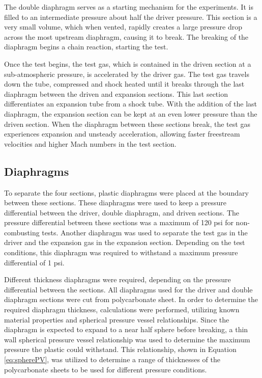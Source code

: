 The double diaphragm serves as a starting mechanism for the experiments. It is filled to an intermediate pressure about half the driver pressure. This section is a very small volume, which when vented, rapidly creates a large pressure drop across the most upstream diaphragm, causing it to break. The breaking of the diaphragm begins a chain reaction, starting the test. 

Once the test begins, the test gas, which is contained in the driven section at a sub-atmospheric pressure, is accelerated by the driver gas. The test gas travels down the tube, compressed and shock heated until it breaks through the last diaphragm between the driven and expansion sections. This last section differentiates an expansion tube from a shock tube. With the addition of the last diaphragm, the expansion section can be kept at an even lower pressure than the driven section. When the diaphragm between these sections break, the test gas experiences  expansion and unsteady acceleration, allowing faster freestream velocities and higher Mach numbers in the test section. 


\subsection{Diaphragms}
To separate the four sections, plastic diaphragms were placed at the boundary between these sections. These diaphragms were used to keep a pressure differential between the driver, double diaphragm, and driven sections. The pressure differential between these sections was a maximum of 120 psi for non-combusting tests. Another diaphragm was used to separate the test gas in the driver and the expansion gas in the expansion section. Depending on the test conditions, this diaphragm was required to withstand a maximum pressure differential of 1 psi. 

Different thickness diaphragms were required, depending on the pressure differential between the sections. All diaphragms used for the driver and double diaphragm sections were cut from polycarbonate sheet. In order to determine the required diaphragm thickness, calculations were performed, utilizing known material properties and spherical pressure vessel relationships. Since the diaphragm is expected to expand to a near half sphere before breaking, a thin wall spherical pressure vessel relationship was used to determine the maximum pressure the plastic could withstand. This relationship, shown in Equation \ref{eq:spherePV}, was utilized to determine a range of thicknesses of the polycarbonate sheets to be used for different pressure conditions. 

